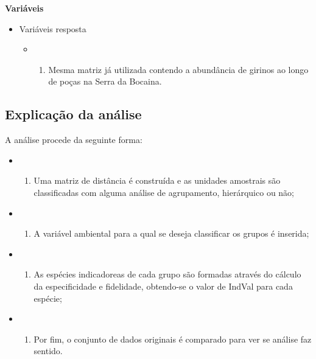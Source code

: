 \documentclass[
]{book}
\providecommand{\tightlist}{%
  \setlength{\itemsep}{0pt}\setlength{\parskip}{0pt}}
\begin{document}
\textbf{Variáveis}

\begin{itemize}
\tightlist
\item
  Variáveis resposta

  \begin{itemize}
  \item
    \begin{enumerate}
    \def\labelenumi{\arabic{enumi}.}
    \tightlist
    \item
      Mesma matriz já utilizada contendo a abundância de girinos ao longo de poças na Serra da Bocaina.
    \end{enumerate}
  \end{itemize}
\end{itemize}

\hypertarget{explicauxe7uxe3o-da-anuxe1lise-2}{%
\subsection{Explicação da análise}\label{explicauxe7uxe3o-da-anuxe1lise-2}}

A análise procede da seguinte forma:

\begin{itemize}
\item
  \begin{enumerate}
  \def\labelenumi{\arabic{enumi}.}
  \tightlist
  \item
    Uma matriz de distância é construída e as unidades amostrais são classificadas com alguma análise de agrupamento, hierárquico ou não;
  \end{enumerate}
\item
  \begin{enumerate}
  \def\labelenumi{\arabic{enumi}.}
  \setcounter{enumi}{1}
  \tightlist
  \item
    A variável ambiental para a qual se deseja classificar os grupos é inserida;
  \end{enumerate}
\item
  \begin{enumerate}
  \def\labelenumi{\arabic{enumi}.}
  \setcounter{enumi}{2}
  \tightlist
  \item
    As espécies indicadoreas de cada grupo são formadas através do cálculo da especificidade e fidelidade, obtendo-se o valor de IndVal para cada espécie;
  \end{enumerate}
\item
  \begin{enumerate}
  \def\labelenumi{\arabic{enumi}.}
  \setcounter{enumi}{3}
  \tightlist
  \item
    Por fim, o conjunto de dados originais é comparado para ver se análise faz sentido.
  \end{enumerate}
\end{itemize}
\end{document}
